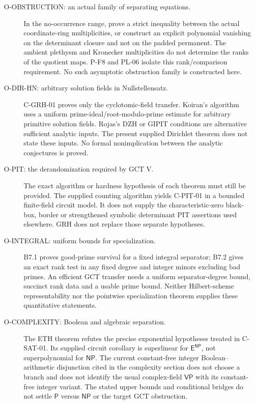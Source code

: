 \documentclass[11pt,a4paper]{article}
\begin{document}
\begin{description}
\item[O-OBSTRUCTION: an actual family of separating equations.]
In the no-occurrence range, prove a strict inequality between the actual
coordinate-ring multiplicities, or construct an explicit polynomial
vanishing on the determinant closure and not on the padded permanent.
The ambient plethysm and Kronecker multiplicities do not determine the
ranks of the quotient maps. P-F8 and PL-06 isolate this rank/comparison
requirement. No such asymptotic obstruction family is constructed here.

\item[O-DIR-HN: arbitrary solution fields in Nullstellensatz.]
C-GRH-01 proves only the cyclotomic-field transfer. Koiran's algorithm uses
a uniform prime-ideal/root-modulo-prime estimate for arbitrary primitive
solution fields. Rojas's DZH or GIPIT conditions are alternative sufficient
analytic inputs. The present supplied Dirichlet theorem does not state
these inputs. No formal nonimplication between the analytic conjectures
is proved.

\item[O-PIT: the derandomization required by GCT V.]
The exact algorithm or hardness hypothesis of each theorem must still be
provided. The supplied counting algorithm yields C-PIT-01 in a bounded
finite-field circuit model. It does not supply the characteristic-zero
black-box, border or strengthened symbolic determinant PIT assertions
used elsewhere. GRH does not replace those separate hypotheses.

\item[O-INTEGRAL: uniform bounds for specialization.]
B7.1 proves good-prime survival for a fixed integral separator; B7.2 gives
an exact rank test in any fixed degree and integer minors excluding bad
primes. An efficient GCT transfer needs a uniform separator-degree bound,
succinct rank data and a usable prime bound. Neither Hilbert-scheme
representability nor the pointwise specialization theorem supplies these
quantitative statements.

\item[O-COMPLEXITY: Boolean and algebraic separation.]
The ETH theorem refutes the precise exponential hypotheses treated in
C-SAT-01. Its supplied circuit corollary is superlinear for
$\mathsf E^{\mathsf{NP}}$, not superpolynomial for $\mathsf{NP}$.
The current constant-free integer Boolean--arithmetic disjunction cited
in the complexity section does not choose a branch and does not identify
the usual complex-field $\mathsf{VP}$ with its constant-free integer
variant. The stated upper bounds and conditional bridges do not settle
$\mathsf P$ versus $\mathsf{NP}$ or the target GCT obstruction.
\end{description}
\end{document}
